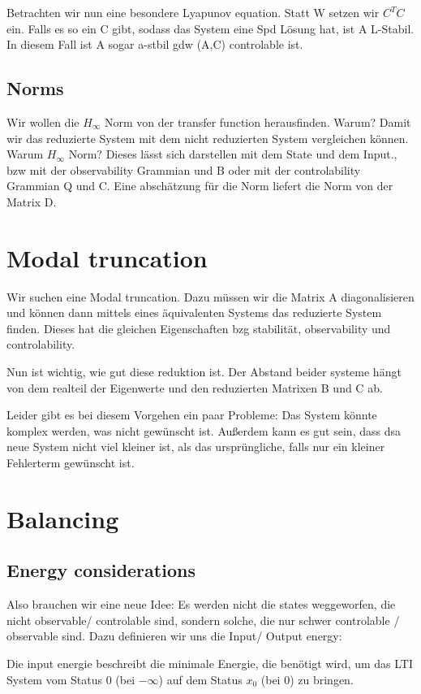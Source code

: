 \documentclass[]{article}
\begin{document}
 Betrachten wir nun eine besondere Lyapunov equation. Statt W setzen wir $C^T C$ ein. Falls es so ein C gibt, sodass das System eine Spd Lösung hat, ist A L-Stabil. In diesem Fall ist A sogar a-stbil gdw (A,C) controlable ist. 
 
 \subsection{Norms}
 Wir wollen die $H_{\infty}$ Norm von der transfer function herausfinden. Warum? Damit wir das reduzierte System mit dem nicht reduzierten System vergleichen können. Warum $H_{\infty}$ Norm? Dieses lässt sich darstellen mit dem State und dem Input., bzw mit der observability Grammian und B oder mit der controlability Grammian Q und C. Eine abschätzung für die Norm liefert die Norm von der Matrix D. 
 
 \section{Modal truncation}
 Wir suchen eine Modal truncation. Dazu müssen wir die Matrix A diagonalisieren und können dann mittels eines äquivalenten Systems das reduzierte System finden. Dieses hat die gleichen Eigenschaften bzg stabilität, observability und controlability. 
 
Nun ist wichtig, wie gut diese reduktion ist. Der Abstand beider systeme hängt von dem realteil der Eigenwerte und den reduzierten Matrixen B und C ab. 

Leider gibt es bei diesem Vorgehen ein paar Probleme: Das System könnte komplex werden, was nicht gewünscht ist. Außerdem  kann es gut sein, dass dsa neue System nicht viel kleiner ist, als das ursprüngliche, falls nur ein kleiner Fehlerterm gewünscht ist. 

\section{Balancing}

\subsection{Energy considerations}
Also brauchen wir eine neue Idee: Es werden nicht die states weggeworfen, die nicht observable/ controlable sind, sondern solche, die nur schwer controlable / observable sind. Dazu definieren wir uns die Input/ Output energy: 

Die input energie beschreibt die minimale Energie, die benötigt wird, um das LTI System vom Status 0 (bei $- \infty$) auf dem Status $x_0$ (bei 0) zu bringen. 
\end{document}
